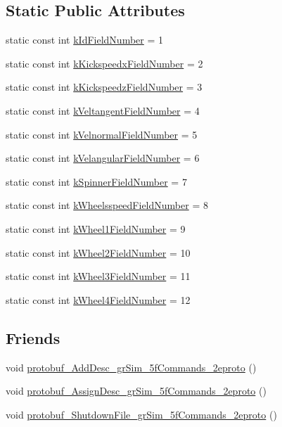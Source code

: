 \subsection*{Static Public Attributes}
\begin{DoxyCompactItemize}
\item 
static const int \hyperlink{classgr_sim___robot___command_a61a9780a4e615dbcdbcd16e20def51a4}{k\-Id\-Field\-Number} = 1
\item 
static const int \hyperlink{classgr_sim___robot___command_a79c7614514e04f46147f614b34ac2b1e}{k\-Kickspeedx\-Field\-Number} = 2
\item 
static const int \hyperlink{classgr_sim___robot___command_adfd9cadfbb30fc07b31482e966cf96a4}{k\-Kickspeedz\-Field\-Number} = 3
\item 
static const int \hyperlink{classgr_sim___robot___command_a99d2ad6dac58d78522c6abed212c9788}{k\-Veltangent\-Field\-Number} = 4
\item 
static const int \hyperlink{classgr_sim___robot___command_a1ddff04c64ddc659431c4eb975a289e7}{k\-Velnormal\-Field\-Number} = 5
\item 
static const int \hyperlink{classgr_sim___robot___command_a14ed45ece0af43bfaba0d5d2008200d3}{k\-Velangular\-Field\-Number} = 6
\item 
static const int \hyperlink{classgr_sim___robot___command_af94c9378619b554bbbd00f33822e3008}{k\-Spinner\-Field\-Number} = 7
\item 
static const int \hyperlink{classgr_sim___robot___command_a9aec2c96d1c4d23fad97bbf924b7e06a}{k\-Wheelsspeed\-Field\-Number} = 8
\item 
static const int \hyperlink{classgr_sim___robot___command_a6c2f3d86e97504684e58c2450f3f2279}{k\-Wheel1\-Field\-Number} = 9
\item 
static const int \hyperlink{classgr_sim___robot___command_a1a16f28719103b1909c8a83204a89551}{k\-Wheel2\-Field\-Number} = 10
\item 
static const int \hyperlink{classgr_sim___robot___command_ae1ffbc5380e6a72aa718b912a23ebf07}{k\-Wheel3\-Field\-Number} = 11
\item 
static const int \hyperlink{classgr_sim___robot___command_af817b78e2983023a8c30bbc3068165ca}{k\-Wheel4\-Field\-Number} = 12
\end{DoxyCompactItemize}
\subsection*{Friends}
\begin{DoxyCompactItemize}
\item 
void \hyperlink{classgr_sim___robot___command_ac56e60ad0bb74c2cc15c499e4e6e996c}{protobuf\-\_\-\-Add\-Desc\-\_\-gr\-Sim\-\_\-5f\-Commands\-\_\-2eproto} ()
\item 
void \hyperlink{classgr_sim___robot___command_aa24258071f5401caefec1ae7a152e533}{protobuf\-\_\-\-Assign\-Desc\-\_\-gr\-Sim\-\_\-5f\-Commands\-\_\-2eproto} ()
\item 
void \hyperlink{classgr_sim___robot___command_a8aa7b603907edafe6e4ec382b96eb854}{protobuf\-\_\-\-Shutdown\-File\-\_\-gr\-Sim\-\_\-5f\-Commands\-\_\-2eproto} ()
\end{DoxyCompactItemize}


